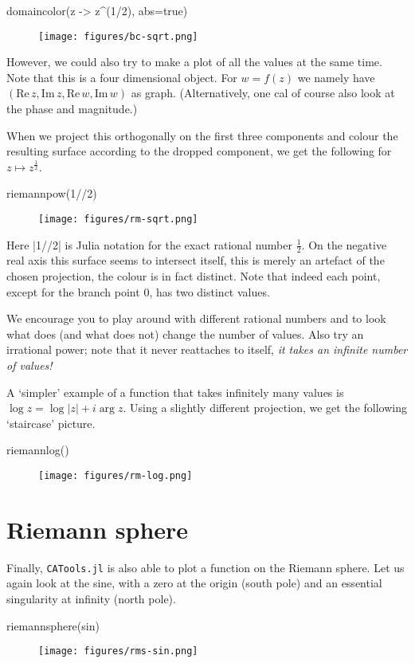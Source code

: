 \documentclass[a4paper]{article}
\begin{document}
	\begin{juliaverbatim}
		domaincolor(z -> z^(1/2), abs=true)
	\end{juliaverbatim}
	\begin{figure}[H]
		\centering
		\texttt{[image: figures/bc-sqrt.png]}
	\end{figure}

	However, we could also try to make a plot of all the values at the same
	time. Note that this is a four dimensional object. For $w = f(z)$ we namely
	have $(\mathrm{Re}\,z, \mathrm{Im}\,z, \mathrm{Re}\,w, \mathrm{Im}\,w)$ as
	graph. (Alternatively, one cal of course also look at the phase and
	magnitude.)

	When we project this orthogonally on the first three components and colour
	the resulting surface according to the dropped component, we get the
	following for $z \mapsto z^{\frac{1}{2}}$.

	\begin{juliaverbatim}
		riemannpow(1//2)
	\end{juliaverbatim}
	\begin{figure}[H]
		\centering
		\texttt{[image: figures/rm-sqrt.png]}
	\end{figure}

	Here \jlv|1//2| is Julia notation for the exact rational number
$\frac{1}{2}$. On the negative real axis this surface seems to intersect
	itself, this is merely an artefact of the chosen projection, the colour is
	in fact distinct. Note that indeed each point, except for the branch point
$0$, has two distinct values.

	We encourage you to play around with different rational numbers and to look what
	does (and what does not) change the number of values. Also try an irrational
	power; note that it never reattaches to itself, \emph{it takes an infinite
		number of values!}

	A `simpler' example of a function that takes infinitely many values is
$\log z = \log |z| + i\arg z$.  Using a slightly different projection, we
get the following `staircase' picture.

\begin{juliaverbatim}
	riemannlog()
\end{juliaverbatim}
\begin{figure}[H]
	\centering
	\texttt{[image: figures/rm-log.png]}
\end{figure}

\section{Riemann sphere}

Finally, \texttt{CATools.jl} is also able to plot a function on the Riemann
sphere.  Let us again look at the sine, with a zero at the origin (south pole)
and an essential singularity at infinity (north pole).

\begin{juliaverbatim}
	riemannsphere(sin)
\end{juliaverbatim}
\begin{figure}[H]
	\centering
	\texttt{[image: figures/rms-sin.png]}
\end{figure}
\end{document}
